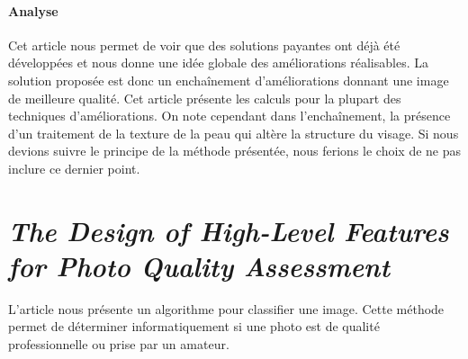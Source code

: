 \documentclass[11pt, french]{report-rd-info}
\begin{document}
\paragraph{Analyse}
Cet article nous permet de voir que des solutions payantes ont déjà été développées et nous donne une idée globale des améliorations réalisables. La solution proposée est donc un enchaînement d’améliorations donnant une image de meilleure qualité.
Cet article présente les calculs pour la plupart des techniques d’améliorations. On note cependant dans l'enchaînement, la présence d’un traitement de la texture de la peau qui altère la structure du visage. Si nous devions suivre le principe de la méthode présentée, nous ferions le choix de ne pas inclure ce dernier point.
\section{\emph{The Design of High-Level Features for Photo Quality Assessment}}
L'article \cite{Ke} nous présente un algorithme pour classifier une image. Cette méthode permet de déterminer informatiquement si une photo est de qualité professionnelle ou prise par un amateur.
\end{document}
